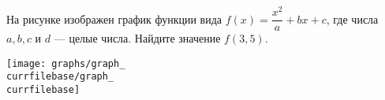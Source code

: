 \begin{ex}
	\begin{condition}
		\begin{minipage}[t]{0.67\textwidth}
			На рисунке изображен график функции вида \( f(x)=\dfrac{x^2}{a}+bx+c \), где числа \( a, b, c \) и \( d \) --- целые числа. Найдите значение \( f(3,5) \).
		\end{minipage}
		\begin{minipage}[c]{0.25\textwidth}
			\texttt{[image: graphs/graph\_\\currfilebase/graph\_\\currfilebase]}
		\end{minipage}
	\end{condition}
\end{ex}